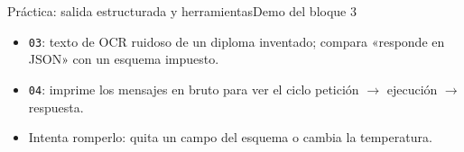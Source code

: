 \begin{frame}{Práctica: salida estructurada y herramientas}{Demo del bloque 3}
	\begin{itemize}
		\small
		\item \texttt{03}: texto de OCR ruidoso de un diploma inventado; compara «responde en JSON» con un esquema impuesto.
		\item \texttt{04}: imprime los mensajes en bruto para ver el ciclo petición $\rightarrow$ ejecución $\rightarrow$ respuesta.
		\item Intenta romperlo: quita un campo del esquema o cambia la temperatura.
	\end{itemize}
\end{frame}
